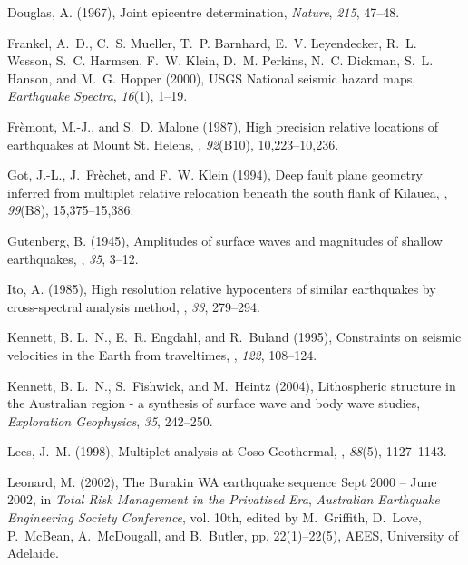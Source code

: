 \documentclass[12pt,double]{article}
\begin{document}
\begin{thebibliography}{45}
Douglas, A. (1967), Joint epicentre determination, \textit{Nature},
  \textit{215}, 47--48.

Frankel, A.~D., C.~S. Mueller, T.~P. Barnhard, E.~V. Leyendecker, R.~L. Wesson,
  S.~C. Harmsen, F.~W. Klein, D.~M. Perkins, N.~C. Dickman, S.~L. Hanson, and
  M.~G. Hopper (2000), {USGS} {N}ational seismic hazard maps,
  \textit{Earthquake Spectra}, \textit{16}(1), 1--19.

Fr\`emont, M.-J., and S.~D. Malone (1987), High precision relative locations of
  earthquakes at {M}ount {St.} {H}elens, \jgr, \textit{92}(B10), 10,223--10,236.

Got, J.-L., J.~Fr\`echet, and F.~W. Klein (1994), Deep fault plane geometry
  inferred from multiplet relative relocation beneath the south flank of
  {K}ilauea, \jgr, \textit{99}(B8),
  15,375--15,386.

Gutenberg, B. (1945), Amplitudes of surface waves and magnitudes of shallow
  earthquakes, \bssa,
  \textit{35}, 3--12.

Ito, A. (1985), High resolution relative hypocenters of similar earthquakes by
  cross-spectral analysis method, \jpe,
  \textit{33}, 279--294.

Kennett, B. L.~N., E.~R. Engdahl, and R.~Buland (1995), Constraints on seismic
  velocities in the {E}arth from traveltimes, \gji, \textit{122}, 108--124.

Kennett, B. L.~N., S.~Fishwick, and M.~Heintz (2004), Lithospheric structure in
  the {A}ustralian region - a synthesis of surface wave and body wave studies,
  \textit{Exploration Geophysics}, \textit{35}, 242--250.

Lees, J.~M. (1998), Multiplet analysis at {C}oso {G}eothermal, \bssa, \textit{88}(5), 1127--1143.

Leonard, M. (2002), The {B}urakin {WA} earthquake sequence {S}ept 2000 --
  {J}une 2002, in \textit{Total Risk Management in the Privatised Era},
  \textit{Australian Earthquake Engineering Society Conference}, vol. 10th,
  edited by M.~Griffith, D.~Love, P.~Mc{B}ean, A.~Mc{D}ougall, and B.~Butler,
  pp. 22(1)--22(5), AEES, University of Adelaide.


\end{thebibliography}
\end{document}

